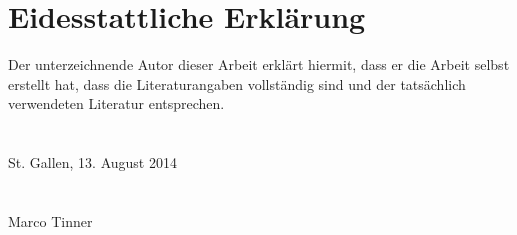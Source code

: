 \chapter{Eidesstattliche Erklärung}

	Der unterzeichnende Autor dieser Arbeit erklärt hiermit, dass er die Arbeit selbst erstellt hat,
	dass die Literaturangaben vollständig sind und der tatsächlich verwendeten Literatur entsprechen.\\
	\\
 	\\
	St. Gallen, 13. August 2014\\
    \\
    \\
  	Marco Tinner\\
